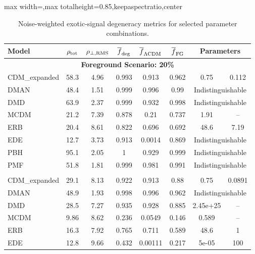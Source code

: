 \begin{table}[p]
\centering
\caption{Noise-weighted exotic-signal degeneracy metrics for selected parameter combinations.}
\label{tab:exotic_metrics}
\begingroup
\renewcommand{\arraystretch}{0.92}
\setlength{\tabcolsep}{4pt}
\begin{adjustbox}{max width=\textwidth,max totalheight=0.85\textheight,keepaspectratio,center}
\begin{tabular}{lccccccc}
\toprule
Model & $\rho_{\rm tot}$ & $\rho_{\perp,\rm RMS}$ & $\overline{f}_{\rm deg}$ & $\overline{f}_{\Lambda\rm CDM}$ & $\overline{f}_{\rm FG}$ & \multicolumn{2}{c}{Parameters} \\
\midrule
\multicolumn{8}{c}{\textbf{Foreground Scenario: 20\%}} \\
\addlinespace[2pt]
CDM\_expanded & 58.3 & 4.96 & 0.993 & 0.913 & 0.962 & 0.75 & 0.112 \\
\rowcolor{gray!10}
DMAN & 48.4 & 1.51 & 0.999 & 0.996 & 0.99 & \multicolumn{2}{c}{Indistinguishable} \\
\rowcolor{gray!10}
DMD & 63.9 & 2.37 & 0.999 & 0.932 & 0.998 & \multicolumn{2}{c}{Indistinguishable} \\
MCDM & 21.2 & 7.39 & 0.878 & 0.21 & 0.737 & 1.91 & -- \\
ERB & 20.4 & 8.61 & 0.822 & 0.696 & 0.692 & 48.6 & 7.19 \\
\rowcolor{gray!10}
EDE & 12.7 & 3.73 & 0.913 & 0.0014 & 0.869 & \multicolumn{2}{c}{Indistinguishable} \\
\rowcolor{gray!10}
PBH & 95.1 & 2.05 & 1 & 0.929 & 0.999 & \multicolumn{2}{c}{Indistinguishable} \\
\rowcolor{gray!10}
PMF & 51.8 & 1.81 & 0.999 & 0.981 & 0.991 & \multicolumn{2}{c}{Indistinguishable} \\
\addlinespace[4pt]
\midrule
\multicolumn{8}{c}{\textbf{Foreground Scenario: 1\%}} \\
\addlinespace[2pt]
CDM\_expanded & 29.1 & 8.13 & 0.922 & 0.913 & 0.88 & 0.75 & 0.0891 \\
\rowcolor{gray!10}
DMAN & 48.9 & 1.93 & 0.998 & 0.996 & 0.962 & \multicolumn{2}{c}{Indistinguishable} \\
DMD & 28.5 & 7.27 & 0.935 & 0.928 & 0.885 & 2.45e+25 & -- \\
MCDM & 9.86 & 8.62 & 0.236 & 0.0549 & 0.146 & 0.589 & -- \\
ERB & 16.3 & 7.92 & 0.765 & 0.711 & 0.589 & 48.6 & 1 \\
EDE & 12.8 & 9.66 & 0.432 & 0.00111 & 0.217 & 5e-05 & 100 \\

\end{tabular}
\end{adjustbox}
\end{table}
